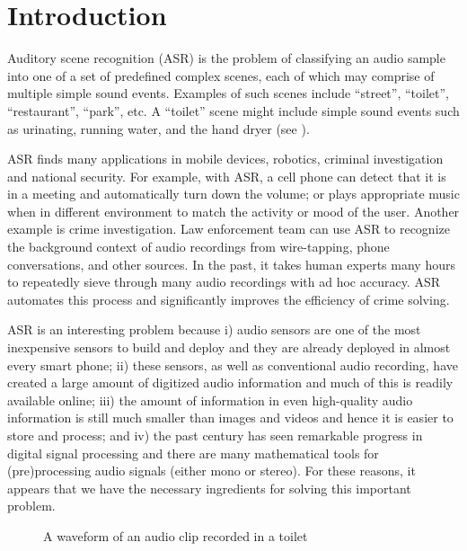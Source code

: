 \section{Introduction}
\label{sec:intro}

Auditory scene recognition (ASR) \cite{5745009} is the problem of 
classifying an audio sample into one of a set of predefined complex
scenes, each of which may comprise of multiple simple sound events. 
Examples of such scenes include ``street'', ``toilet'', ``restaurant'', 
``park'', etc. A ``toilet'' scene might include simple sound events such as
urinating, running water, and the hand dryer (see ).
 
ASR finds many applications in mobile devices, robotics, criminal 
investigation and national security. For example, with ASR, a cell phone
can detect that it is in a meeting and automatically turn down the volume;
or plays appropriate music when in different environment to match the activity
or mood of the user. Another example is crime investigation. Law enforcement
team can use ASR to recognize the background context of audio recordings from
wire-tapping, phone conversations, and other sources. In the past, it takes 
human experts many hours to repeatedly sieve through many audio recordings
with ad hoc accuracy. ASR automates this process and significantly
improves the efficiency of crime solving.

ASR is an interesting problem because i) audio sensors are one of the most
inexpensive sensors to build and deploy and they are already deployed in
almost every smart phone; ii) these sensors, as well as conventional audio
recording, have created a large amount of digitized audio information and
much of this is readily available online; iii) the amount of information
in even high-quality audio information is still much smaller than 
images and videos and hence it is easier to store and process; 
and iv) the past century has
seen remarkable progress in digital signal processing and there are many
mathematical tools for (pre)processing audio signals (either mono or stereo).
For these reasons, it appears that we have the necessary ingredients
for solving this important problem. 

\begin{figure}[th]
\centering
{}
\caption{A waveform of an audio clip recorded in a toilet}
\label{fig:exa}
\end{figure}

